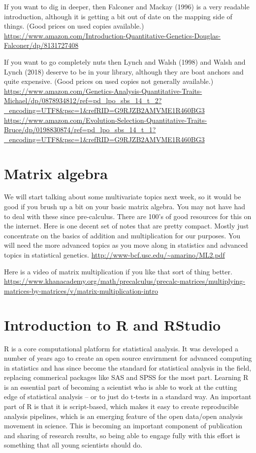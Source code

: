 \documentclass[
]{book}
\begin{document}
If you want to dig in deeper, then Falconer and Mackay (1996) is a very readable introduction, although it is getting a bit out of date on the mapping side of things. (Good prices on used copies available.)
\url{https://www.amazon.com/Introduction-Quantitative-Genetics-Douglas-Falconer/dp/8131727408}

If you want to go completely nuts then Lynch and Walsh (1998) and Walsh and Lynch (2018) deserve to be in your library, although they are boat anchors and quite expensive. (Good prices on used copies not generally available.)
\url{https://www.amazon.com/Genetics-Analysis-Quantitative-Traits-Michael/dp/0878934812/ref=pd_lpo_sbs_14_t_2?_encoding=UTF8\&psc=1\&refRID=G9RJZB2AMVME1R460BG3}
\url{https://www.amazon.com/Evolution-Selection-Quantitative-Traits-Bruce/dp/0198830874/ref=pd_lpo_sbs_14_t_1?_encoding=UTF8\&psc=1\&refRID=G9RJZB2AMVME1R460BG3}

\hypertarget{matrix-algebra}{%
\section{Matrix algebra}\label{matrix-algebra}}

We will start talking about some multivariate topics next week, so it would be good if you brush up a bit on your basic matrix algebra. You may not have had to deal with these since pre-calculus. There are 100's of good resources for this on the internet. Here is one decent set of notes that are pretty compact. Mostly just concentrate on the basics of addition and multiplication for our purposes. You will need the more advanced topics as you move along in statistics and advanced topics in statistical genetics.
\url{http://www-bcf.usc.edu/~amarino/ML2.pdf}

Here is a video of matrix multiplication if you like that sort of thing better.
\url{https://www.khanacademy.org/math/precalculus/precalc-matrices/multiplying-matrices-by-matrices/v/matrix-multiplication-intro}

\hypertarget{introduction-to-r-and-rstudio}{%
\section{Introduction to R and RStudio}\label{introduction-to-r-and-rstudio}}

R is a core computational platform for statistical analysis. It was developed a number of years ago to create an open source envirnment for advanced computing in statistics and has since become the standard for statistical analysis in the field, replacing commerical packages like SAS and SPSS for the most part. Learning R is an essential part of becoming a scientist who is able to work at the cutting edge of statistical analysis -- or to just do t-tests in a standard way. An important part of R is that it is script-based, which makes it easy to create reproducible analysis pipelines, which is an emerging feature of the open data/open analysis movement in science. This is becoming an important component of publication and sharing of research results, so being able to engage fully with this effort is something that all young scientists should do.
\end{document}
